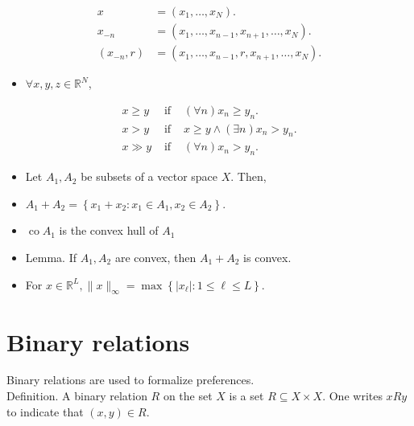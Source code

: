 \documentclass[10pt]{article}
\begin{document}
$$
\begin{aligned}
x & =\left(x_{1}, \ldots, x_{N}\right) . \\
x_{-n} & =\left(x_{1}, \ldots, x_{n-1}, x_{n+1}, \ldots, x_{N}\right) . \\
\left(x_{-n}, r\right) & =\left(x_{1}, \ldots, x_{n-1}, r, x_{n+1}, \ldots, x_{N}\right) .
\end{aligned}
$$

\begin{itemize}
  \item $\forall x, y, z \in \mathbb{R}^{N}$,
\end{itemize}

$$
\begin{array}{lll}
x \geq y & \text { if } & (\forall n) x_{n} \geq y_{n} . \\
x>y & \text { if } & x \geq y \wedge(\exists n) x_{n}>y_{n} . \\
x \gg y & \text { if } & (\forall n) x_{n}>y_{n} .
\end{array}
$$

\begin{itemize}
  \item Let $A_{1}, A_{2}$ be subsets of a vector space $X$. Then,
  \item $A_{1}+A_{2}=\left\{x_{1}+x_{2}: x_{1} \in A_{1}, x_{2} \in A_{2}\right\}$.
  \item $\operatorname{co} A_{1}$ is the convex hull of $A_{1}$
  \item Lemma. If $A_{1}, A_{2}$ are convex, then $A_{1}+A_{2}$ is convex.
  \item For $x \in \mathbb{R}^{L},\|x\|_{\infty}=\max \left\{\left|x_{\ell}\right|: 1 \leq \ell \leq L\right\}$.
\end{itemize}

\section*{Binary relations}
Binary relations are used to formalize preferences.\\
Definition. A binary relation $R$ on the set $X$ is a set $R \subseteq X \times X$. One writes $x R y$ to indicate that $(x, y) \in R$.
\end{document}

